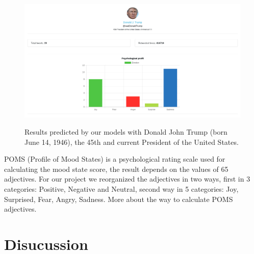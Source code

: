 \documentclass{acmtog} %
\begin{document}
\begin{figure}[h!]
{\includegraphics[width=\linewidth]{Trump-results-analysis_exemple.png}}
\caption{Results predicted by our models with Donald John Trump (born June 14, 1946), the 45th and current President of the United States.}
  \label{fig:trump_results}
\end{figure}

POMS (Profile of Mood States) is a psychological rating scale used for calculating the mood state score, the result depends on the values of 65 adjectives. For our project we reorganized the adjectives in two ways, first in 3 categories: Positive, Negative and Neutral, second way in 5 categories: Joy, Surprised, Fear, Angry, Sadness. More about the way to calculate POMS adjectives.

\section{Disucussion}
\label{sec:discussion}
\end{document}

